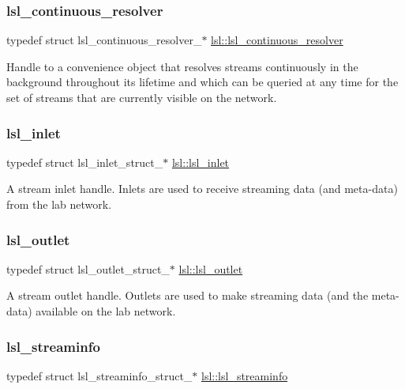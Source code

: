 \subsubsection{\texorpdfstring{lsl\+\_\+continuous\+\_\+resolver}{lsl\_continuous\_resolver}}
{\footnotesize\ttfamily typedef struct lsl\+\_\+continuous\+\_\+resolver\+\_\+$\ast$ \hyperlink{namespacelsl_ab09ea0488f986f056322c3c866dc0a0f}{lsl\+::lsl\+\_\+continuous\+\_\+resolver}}

Handle to a convenience object that resolves streams continuously in the background throughout its lifetime and which can be queried at any time for the set of streams that are currently visible on the network. \mbox{\label{namespacelsl_a884a3363cfcba75d7ce8f00c1c4c54f1}} 
\subsubsection{\texorpdfstring{lsl\+\_\+inlet}{lsl\_inlet}}
{\footnotesize\ttfamily typedef struct lsl\+\_\+inlet\+\_\+struct\+\_\+$\ast$ \hyperlink{namespacelsl_a884a3363cfcba75d7ce8f00c1c4c54f1}{lsl\+::lsl\+\_\+inlet}}

A stream inlet handle. Inlets are used to receive streaming data (and meta-\/data) from the lab network. \mbox{\label{namespacelsl_abcf512b0f66dacf86c10b165995fd50b}} 
\subsubsection{\texorpdfstring{lsl\+\_\+outlet}{lsl\_outlet}}
{\footnotesize\ttfamily typedef struct lsl\+\_\+outlet\+\_\+struct\+\_\+$\ast$ \hyperlink{namespacelsl_abcf512b0f66dacf86c10b165995fd50b}{lsl\+::lsl\+\_\+outlet}}

A stream outlet handle. Outlets are used to make streaming data (and the meta-\/data) available on the lab network. \mbox{\label{namespacelsl_aa0a9ce9956061679949daa2e35aae2e8}} 
\subsubsection{\texorpdfstring{lsl\+\_\+streaminfo}{lsl\_streaminfo}}
{\footnotesize\ttfamily typedef struct lsl\+\_\+streaminfo\+\_\+struct\+\_\+$\ast$ \hyperlink{namespacelsl_aa0a9ce9956061679949daa2e35aae2e8}{lsl\+::lsl\+\_\+streaminfo}}


